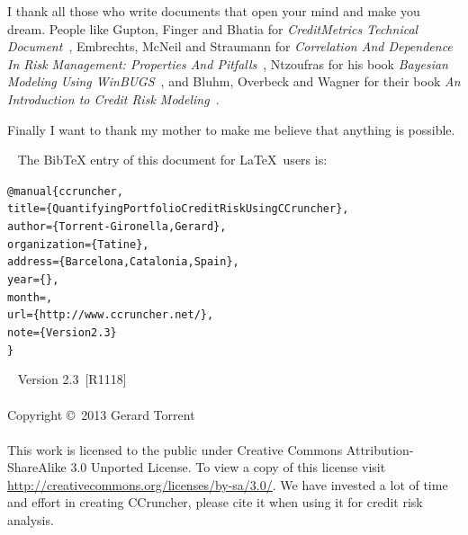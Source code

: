 \documentclass[11pt,fleqn]{book} %
\def\numversion{2.3}
\def\svnversion{R1118}
\begin{document}
I thank all those who write documents that open your mind and make you dream. 
People like Gupton, Finger and Bhatia for \emph{CreditMetrics Technical 
Document}~\cite{cmetrics:1997}, Embrechts, McNeil and Straumann for
\emph{Correlation And Dependence In Risk Management: Properties And 
Pitfalls}~\cite{embrechts:2002}, Ntzoufras for his book \emph{Bayesian Modeling 
Using WinBUGS}~\cite{ntzoufras:2009}, and Bluhm, Overbeck and Wagner for their 
book \emph{An Introduction to Credit Risk Modeling}~\cite{bluhm:2002}.

Finally I want to thank my mother to make me believe that anything is 
possible.


~\vfill
The BibTeX entry of this document for \LaTeX\ users is:
\begin{alltt}
@manual\{ccruncher,
    title = \{Quantifying Portfolio Credit Risk Using CCruncher\},
    author = \{Torrent-Gironella, Gerard\},
    organization = \{Tatine\},
    address = \{Barcelona, Catalonia, Spain\},
    year = \{\the\year\}, 
    month = \shortmonthname,
    url = \{http://www.ccruncher.net/\},
    note = \{Version \numversion\}
\}
\end{alltt}

~\vfill
\thispagestyle{empty}
\noindent Version \numversion\ [\svnversion]\\ 
\\
\noindent Copyright \copyright\ 2013 Gerard Torrent\\
\\
\noindent 
This work is licensed to the public under Creative Commons 
Attribution-ShareAlike 3.0 Unported License. To view a copy 
of this license visit 
\url{http://creativecommons.org/licenses/by-sa/3.0/}.
We have invested a lot of time and effort in creating CCruncher, 
please cite it when using it for credit risk analysis.


\pagestyle{empty}
\setcounter{tocdepth}{1}
\tableofcontents
\cleardoublepage
\pagestyle{fancy}
\end{document}
